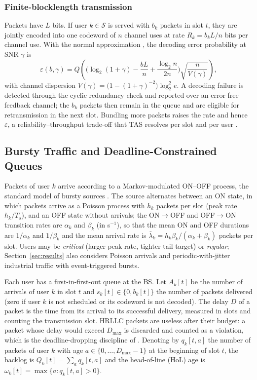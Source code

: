 \documentclass[journal]{IEEEtran}
\newcommand{\Dmax}{D_{\max}}
\newcommand{\Sset}{\mathcal{S}}
\begin{document}
\subsubsection{Finite-blocklength transmission} Packets have $L$ bits. If user $k\in\Sset$ is served with $b_k$ packets in slot $t$, they are jointly encoded into one codeword of $n$ channel uses at rate $R_k=b_kL/n$ bits per channel use. With the normal approximation \cite{Polyanskiy2010}, the decoding error probability at SNR $\gamma$ is
\begin{equation}\label{eq:fbl}
\varepsilon(b,\gamma)=Q\!\left(\Big(\log_2(1+\gamma)-\frac{bL}{n}+\frac{\log_2 n}{2n}\Big)\sqrt{\frac{n}{V(\gamma)}}\right),
\end{equation}
with channel dispersion $V(\gamma)=\big(1-(1+\gamma)^{-2}\big)\log_2^2 e$. A decoding failure is detected through the cyclic redundancy check and reported over an error-free feedback channel; the $b_k$ packets then remain in the queue and are eligible for retransmission in the next slot. Bundling more packets raises the rate and hence $\varepsilon$, a reliability--throughput trade-off that TAS resolves per slot and per user \cite{Zhao2022QueueAware}.

\subsection{Bursty Traffic and Deadline-Constrained Queues}
Packets of user $k$ arrive according to a Markov-modulated ON--OFF process, the standard model of bursty sources \cite{Anick1982,Elwalid1993,Ozmen2016}. The source alternates between an ON state, in which packets arrive as a Poisson process with $h_k$ packets per slot (peak rate $h_k/T_s$), and an OFF state without arrivals; the ON$\to$OFF and OFF$\to$ON transition rates are $\alpha_k$ and $\beta_k$ (in s$^{-1}$), so that the mean ON and OFF durations are $1/\alpha_k$ and $1/\beta_k$ and the mean arrival rate is $\bar\lambda_k=h_k\beta_k/(\alpha_k+\beta_k)$ packets per slot. Users may be \emph{critical} (larger peak rate, tighter tail target) or \emph{regular}; Section~\ref{sec:results} also considers Poisson arrivals and periodic-with-jitter industrial traffic \cite{3GPP-TS22104} with event-triggered bursts.

Each user has a first-in-first-out queue at the BS. Let $A_k[t]$ be the number of arrivals of user $k$ in slot $t$ and $s_k[t]\in\{0,b_k[t]\}$ the number of packets delivered (zero if user $k$ is not scheduled or its codeword is not decoded). The delay $D$ of a packet is the time from its arrival to its successful delivery, measured in slots and counting the transmission slot. HRLLC packets are useless after their budget: a packet whose delay would exceed $\Dmax$ is discarded and counted as a violation, which is the deadline-dropping discipline of \cite{Zhang2025HRL}. Denoting by $q_k[t,a]$ the number of packets of user $k$ with age $a\in\{0,\dots,\Dmax-1\}$ at the beginning of slot $t$, the backlog is $Q_k[t]=\sum_a q_k[t,a]$ and the head-of-line (HoL) age is $\omega_k[t]=\max\{a: q_k[t,a]>0\}$.
\end{document}
